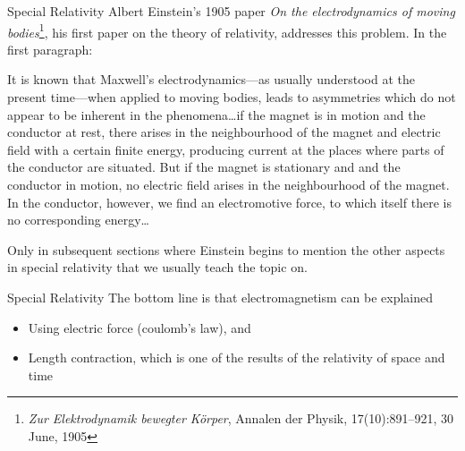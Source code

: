 \documentclass[12pt,aspectratio=169]{beamer}
\begin{document}
\begin{frame}{Special Relativity}
  Albert Einstein's 1905 paper
  \emph{On the electrodynamics of moving bodies}\footnote{\emph{Zur
  Elektrodynamik bewegter K\"{o}rper}, Annalen der Physik, 17(10):891--921,
  30 June, 1905}, his first paper on the theory of relativity, addresses this
  problem. In the first paragraph:
  \begin{center}
    \begin{minipage}{.8\textwidth}
      \footnotesize
      It is known that Maxwell's electrodynamics---as usually understood at the
      present time---when applied to moving bodies, leads to asymmetries which
      do not appear to be inherent in the phenomena\ldots if the magnet is
      in motion and the conductor at rest, there arises in the neighbourhood of
      the magnet and electric field with a certain finite energy, producing
      current at the places where parts of the conductor are situated. But if
      the magnet is stationary and and the conductor in motion, no electric
      field arises in the neighbourhood of the magnet. In the conductor,
      however, we find an electromotive force, to which itself there is no
      corresponding energy\ldots
    \end{minipage}
  \end{center}
  Only in subsequent sections where Einstein begins to mention the other
  aspects in special relativity that we usually teach the topic on.
  \vspace{.2in}
\end{frame}



\begin{frame}{Special Relativity}
  The bottom line is that electromagnetism can be explained
  \begin{itemize}
  \item Using electric force (coulomb's law), and
  \item Length contraction, which is one of the results of the relativity of
    space and time
  \end{itemize}
\end{frame}
\end{document}
